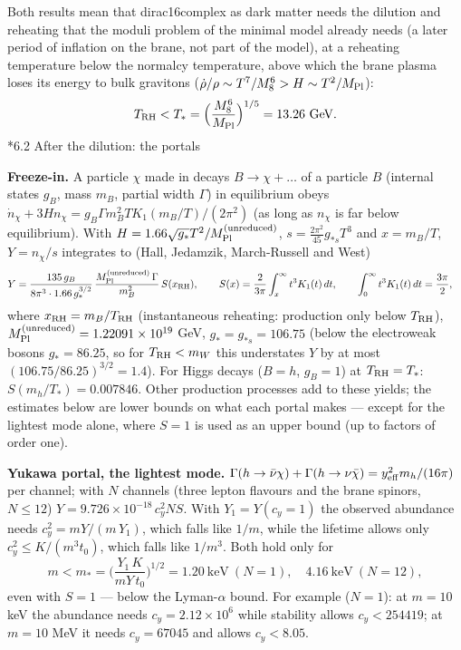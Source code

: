 \documentclass[10pt,a4paper]{article}
\makeatletter
\renewcommand\subsection{\@startsection{subsection}{2}{\z@}{-3.25ex\@plus -1ex \@minus -.2ex}{1.5ex \@plus .2ex}{\normalfont\large\bfseries\raggedright}}
\makeatother
\begin{document}
Both results mean that dirac16complex as dark matter needs the dilution and reheating that the moduli problem of the minimal model already needs (a later period of inflation on the brane, not part of the model), at a reheating temperature below the normalcy temperature, above which the brane plasma loses its energy to bulk gravitons ($\dot\rho/\rho\sim T^7/M_8^6>H\sim T^2/M_{\rm Pl}$):
\begin{equation*}
T_{\rm RH}<T_*=\Big(\frac{M_8^6}{M_{\rm Pl}}\Big)^{1/5}=13.26\ \text{GeV}.
\end{equation*}
\subsection*{6.2 After the dilution: the portals}
\textbf{Freeze-in.} A particle $\chi$ made in decays $B\to\chi+\dots$ of a particle $B$ (internal states $g_B$, mass $m_B$, partial width $\Gamma$) in equilibrium obeys $\dot n_\chi+3Hn_\chi=g_B\Gamma m_B^2TK_1(m_B/T)/(2\pi^2)$ (as long as $n_\chi$ is far below equilibrium). With $H=1.66\sqrt{g_*}T^2/M_{\rm Pl}^{\rm (unreduced)}$, $s=\frac{2\pi^2}{45}g_{*s}T^3$ and $x=m_B/T$, $Y=n_\chi/s$ integrates to (Hall, Jedamzik, March-Russell and West)
\begin{align*}
Y&=\frac{135\,g_B}{8\pi^3\cdot1.66\,g_*^{3/2}}\,\frac{M_{\rm Pl}^{\rm (unreduced)}\,\Gamma}{m_B^2}\,S(x_{\rm RH}),\qquad S(x)=\frac2{3\pi}\int_x^\infty t^3K_1(t)\,dt,\qquad \int_0^\infty t^3K_1(t)\,dt=\frac{3\pi}2,
\end{align*}
where $x_{\rm RH}=m_B/T_{\rm RH}$ (instantaneous reheating: production only below $T_{\rm RH}$), $M_{\rm Pl}^{\rm (unreduced)}=1.22091\times10^{19}$ GeV, $g_*=g_{*s}=106.75$ (below the electroweak bosons $g_*=86.25$, so for $T_{\rm RH}<m_W$ this understates $Y$ by at most $(106.75/86.25)^{3/2}=1.4$). For Higgs decays ($B=h$, $g_B=1$) at $T_{\rm RH}=T_*$: $S(m_h/T_*)=0.007846$. Other production processes add to these yields; the estimates below are lower bounds on what each portal makes — except for the lightest mode alone, where $S=1$ is used as an upper bound (up to factors of order one).

\textbf{Yukawa portal, the lightest mode.} $\Gamma(h\to\bar\nu\chi)+\Gamma(h\to\nu\bar\chi)=y_{\rm eff}^2m_h/(16\pi)$ per channel; with $N$ channels (three lepton flavours and the brane spinors, $N\le12$) $Y=9.726\times10^{-18}\,c_y^2NS$. With $Y_1=Y(c_y=1)$ the observed abundance needs $c_y^2=mY/(m\,Y_1)$, which falls like $1/m$, while the lifetime allows only $c_y^2\le K/(m^3t_0)$, which falls like $1/m^3$. Both hold only for
\begin{equation*}
m<m_*=\Big(\frac{Y_1\,K}{mY\,t_0}\Big)^{1/2}=1.20\ \text{keV}\ (N=1),\quad 4.16\ \text{keV}\ (N=12),
\end{equation*}
even with $S=1$ — below the Lyman-$\alpha$ bound. For example ($N=1$): at $m=10$ keV the abundance needs $c_y=2.12\times10^{6}$ while stability allows $c_y<254419$; at $m=10$ MeV it needs $c_y=67045$ and allows $c_y<8.05$.
\end{document}
